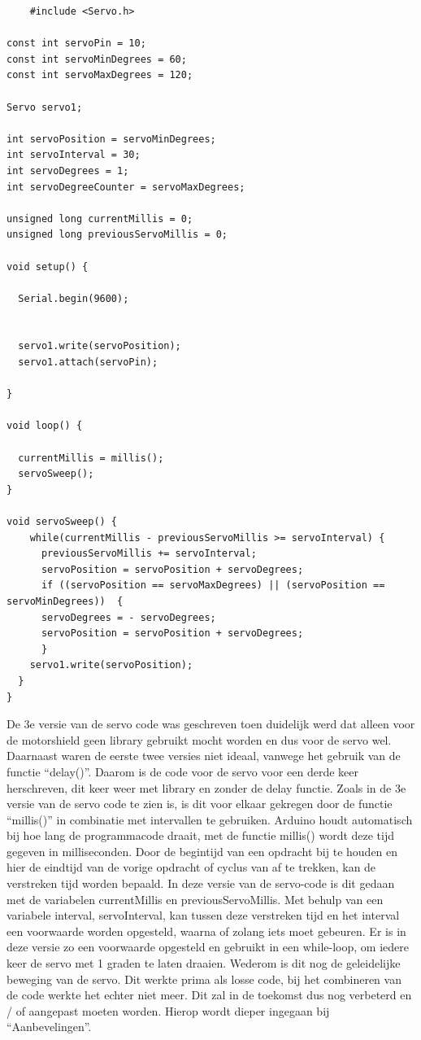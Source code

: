 \begin{lstlisting}
    #include <Servo.h>

const int servoPin = 10; 
const int servoMinDegrees = 60; 
const int servoMaxDegrees = 120;

Servo servo1;

int servoPosition = servoMinDegrees;    
int servoInterval = 30; 
int servoDegrees = 1;       
int servoDegreeCounter = servoMaxDegrees;

unsigned long currentMillis = 0;    
unsigned long previousServoMillis = 0; 

void setup() {

  Serial.begin(9600);
  
  
  servo1.write(servoPosition); 
  servo1.attach(servoPin);
 
}

void loop() {

  currentMillis = millis();
  servoSweep();
}

void servoSweep() {
    while(currentMillis - previousServoMillis >= servoInterval) {
      previousServoMillis += servoInterval;
      servoPosition = servoPosition + servoDegrees; 
      if ((servoPosition == servoMaxDegrees) || (servoPosition == servoMinDegrees))  {
      servoDegrees = - servoDegrees; 
      servoPosition = servoPosition + servoDegrees; 
      }  
    servo1.write(servoPosition);
  }
}
\end{lstlisting}

De 3e versie van de servo code was geschreven toen duidelijk werd dat alleen voor de motorshield geen library gebruikt mocht worden en dus voor de servo wel. Daarnaast waren de eerste twee versies niet ideaal, vanwege het gebruik van de functie “delay()”. Daarom is de code voor de servo voor een derde keer herschreven, dit keer weer met library en zonder de delay functie\cite{Functie-millis-info}. 
Zoals in de 3e versie van de servo code te zien is, is dit voor elkaar gekregen door de functie “millis()” in combinatie met intervallen te gebruiken. Arduino\cite{ArduinoMEGA} houdt automatisch bij hoe lang de programmacode draait, met de functie millis() wordt deze tijd gegeven in milliseconden. Door de begintijd van een opdracht bij te houden en hier de eindtijd van de vorige opdracht of cyclus van af te trekken, kan de verstreken tijd worden bepaald. In deze versie van de servo-code is dit gedaan met de variabelen 
currentMillis en previousServoMillis. Met behulp van een variabele interval, servoInterval, kan tussen deze verstreken tijd en het interval een voorwaarde worden opgesteld, waarna of zolang iets moet gebeuren. Er is in deze versie zo een voorwaarde opgesteld en gebruikt in een while-loop, om iedere keer de servo met 1 graden te laten draaien. Wederom is dit nog de geleidelijke beweging van de servo.
Dit werkte prima als losse code, bij het combineren van de code werkte het echter niet meer. Dit zal in de toekomst dus nog verbeterd en / of aangepast moeten worden. Hierop wordt dieper ingegaan bij “Aanbevelingen”.


